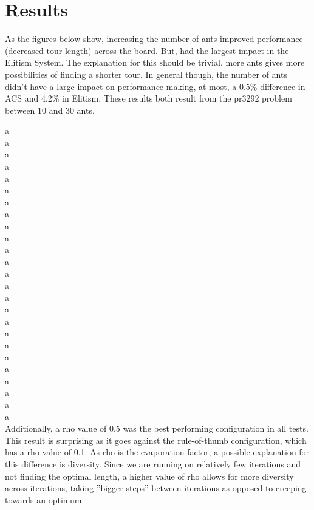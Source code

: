\documentclass[11pt,twocolumn]{article}
\begin{document}
\section{Results} 
As the figures below show, increasing the number of ants improved performance (decreased tour length) across the board. But, had the largest impact in the Elitism System. The explanation for this should be trivial, more ants gives more possibilities of finding a shorter tour. In general though, the number of ants didn’t have a large impact on performance making, at most, a 0.5\% difference in ACS and 4.2\% in Elitism. These results both result from the pr3292 problem between 10 and 30 ants. 

a\\a\\a\\a\\a\\a\\a\\a\\a\\a\\a\\a\\a\\a\\a\\a\\a\\a\\a\\a\\a\\a\\a\\a\\a\\


Additionally, a rho value of 0.5 was the best performing configuration in all tests. This result is surprising as it goes against the rule-of-thumb configuration, which has a rho value of 0.1. As rho is the evaporation factor, a possible explanation for this difference is diversity. Since we are running on relatively few iterations and not finding the optimal length, a higher value of rho allows for more diversity across iterations, taking ''bigger steps'' between iterations as opposed to creeping towards an optimum. 
\end{document}

